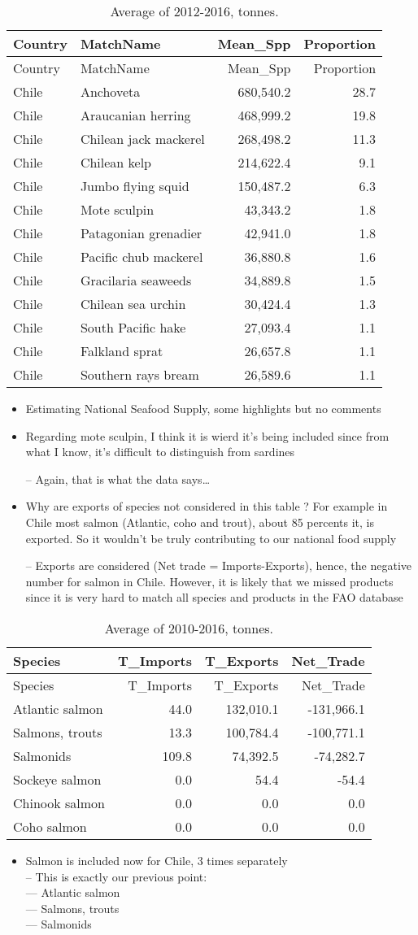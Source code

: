 \documentclass[]{article}
\providecommand{\tightlist}{%
  \setlength{\itemsep}{0pt}\setlength{\parskip}{0pt}}
\begin{document}
\begin{longtable}[]{@{}llrr@{}}
\caption{Average of 2012-2016, tonnes.}\tabularnewline
\toprule
Country & MatchName & Mean\_Spp & Proportion\tabularnewline
\midrule
\endfirsthead
\toprule
Country & MatchName & Mean\_Spp & Proportion\tabularnewline
\midrule
\endhead
Chile & Anchoveta & 680,540.2 & 28.7\tabularnewline
Chile & Araucanian herring & 468,999.2 & 19.8\tabularnewline
Chile & Chilean jack mackerel & 268,498.2 & 11.3\tabularnewline
Chile & Chilean kelp & 214,622.4 & 9.1\tabularnewline
Chile & Jumbo flying squid & 150,487.2 & 6.3\tabularnewline
Chile & Mote sculpin & 43,343.2 & 1.8\tabularnewline
Chile & Patagonian grenadier & 42,941.0 & 1.8\tabularnewline
Chile & Pacific chub mackerel & 36,880.8 & 1.6\tabularnewline
Chile & Gracilaria seaweeds & 34,889.8 & 1.5\tabularnewline
Chile & Chilean sea urchin & 30,424.4 & 1.3\tabularnewline
Chile & South Pacific hake & 27,093.4 & 1.1\tabularnewline
Chile & Falkland sprat & 26,657.8 & 1.1\tabularnewline
Chile & Southern rays bream & 26,589.6 & 1.1\tabularnewline
\bottomrule
\end{longtable}

\begin{itemize}
\item
  Estimating National Seafood Supply, some highlights but no comments
\item
  Regarding mote sculpin, I think it is wierd it's being included since
  from what I know, it's difficult to distinguish from sardines

  -- Again, that is what the data says\ldots{}
\item
  Why are exports of species not considered in this table ? For example
  in Chile most salmon (Atlantic, coho and trout), about 85 percents it,
  is exported. So it wouldn't be truly contributing to our national food
  supply

  -- Exports are considered (Net trade = Imports-Exports), hence, the
  negative number for salmon in Chile. However, it is likely that we
  missed products since it is very hard to match all species and
  products in the FAO database
\end{itemize}

\begin{longtable}[]{@{}lrrr@{}}
\caption{Average of 2010-2016, tonnes.}\tabularnewline
\toprule
Species & T\_Imports & T\_Exports & Net\_Trade\tabularnewline
\midrule
\endfirsthead
\toprule
Species & T\_Imports & T\_Exports & Net\_Trade\tabularnewline
\midrule
\endhead
Atlantic salmon & 44.0 & 132,010.1 & -131,966.1\tabularnewline
Salmons, trouts & 13.3 & 100,784.4 & -100,771.1\tabularnewline
Salmonids & 109.8 & 74,392.5 & -74,282.7\tabularnewline
Sockeye salmon & 0.0 & 54.4 & -54.4\tabularnewline
Chinook salmon & 0.0 & 0.0 & 0.0\tabularnewline
Coho salmon & 0.0 & 0.0 & 0.0\tabularnewline
\bottomrule
\end{longtable}

\begin{itemize}
\tightlist
\item
  Salmon is included now for Chile, 3 times separately\\
  -- This is exactly our previous point:\\
  --- Atlantic salmon\\
  --- Salmons, trouts\\
  --- Salmonids
\end{itemize}
\end{document}
